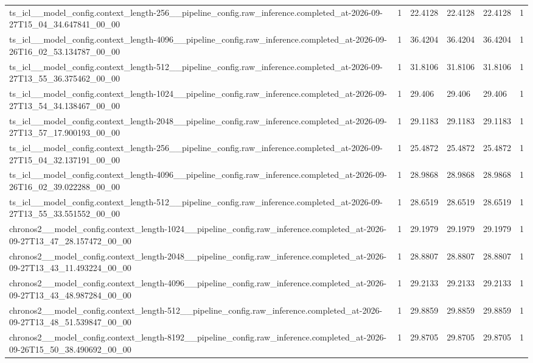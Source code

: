 \begin{tabular}{llllll}
ts\_icl\_\_model\_config.context\_length-256\_\_pipeline\_config.raw\_inference.completed\_at-2026-09-27T15\_04\_34.647841\_00\_00 & 1 & 22.4128 & 22.4128 & 22.4128 & 1 \\
ts\_icl\_\_model\_config.context\_length-4096\_\_pipeline\_config.raw\_inference.completed\_at-2026-09-26T16\_02\_53.134787\_00\_00 & 1 & 36.4204 & 36.4204 & 36.4204 & 1 \\
ts\_icl\_\_model\_config.context\_length-512\_\_pipeline\_config.raw\_inference.completed\_at-2026-09-27T13\_55\_36.375462\_00\_00 & 1 & 31.8106 & 31.8106 & 31.8106 & 1 \\
ts\_icl\_\_model\_config.context\_length-1024\_\_pipeline\_config.raw\_inference.completed\_at-2026-09-27T13\_54\_34.138467\_00\_00 & 1 & 29.406 & 29.406 & 29.406 & 1 \\
ts\_icl\_\_model\_config.context\_length-2048\_\_pipeline\_config.raw\_inference.completed\_at-2026-09-27T13\_57\_17.900193\_00\_00 & 1 & 29.1183 & 29.1183 & 29.1183 & 1 \\
ts\_icl\_\_model\_config.context\_length-256\_\_pipeline\_config.raw\_inference.completed\_at-2026-09-27T15\_04\_32.137191\_00\_00 & 1 & 25.4872 & 25.4872 & 25.4872 & 1 \\
ts\_icl\_\_model\_config.context\_length-4096\_\_pipeline\_config.raw\_inference.completed\_at-2026-09-26T16\_02\_39.022288\_00\_00 & 1 & 28.9868 & 28.9868 & 28.9868 & 1 \\
ts\_icl\_\_model\_config.context\_length-512\_\_pipeline\_config.raw\_inference.completed\_at-2026-09-27T13\_55\_33.551552\_00\_00 & 1 & 28.6519 & 28.6519 & 28.6519 & 1 \\
chronos2\_\_model\_config.context\_length-1024\_\_pipeline\_config.raw\_inference.completed\_at-2026-09-27T13\_47\_28.157472\_00\_00 & 1 & 29.1979 & 29.1979 & 29.1979 & 1 \\
chronos2\_\_model\_config.context\_length-2048\_\_pipeline\_config.raw\_inference.completed\_at-2026-09-27T13\_43\_11.493224\_00\_00 & 1 & 28.8807 & 28.8807 & 28.8807 & 1 \\
chronos2\_\_model\_config.context\_length-4096\_\_pipeline\_config.raw\_inference.completed\_at-2026-09-27T13\_43\_48.987284\_00\_00 & 1 & 29.2133 & 29.2133 & 29.2133 & 1 \\
chronos2\_\_model\_config.context\_length-512\_\_pipeline\_config.raw\_inference.completed\_at-2026-09-27T13\_48\_51.539847\_00\_00 & 1 & 29.8859 & 29.8859 & 29.8859 & 1 \\
chronos2\_\_model\_config.context\_length-8192\_\_pipeline\_config.raw\_inference.completed\_at-2026-09-26T15\_50\_38.490692\_00\_00 & 1 & 29.8705 & 29.8705 & 29.8705 & 1 \\

\end{tabular}
